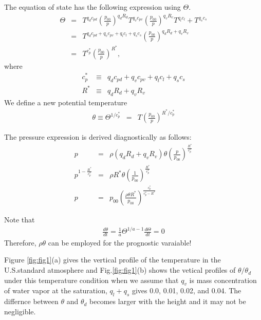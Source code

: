 The equation of state has the following expression using $\Theta$.
\begin{eqnarray}
\Theta &=& 
T^{q_d c_{pd}} \left(\frac{p_{00}}{p}\right)^{q_d R_d} 
T^{q_v c_{pv}} \left(\frac{p_{00}}{p}\right)^{q_v R_v}
T^{q_l c_l}  + T^{q_s c_s} \\
&=& 
T^{q_d c_{pd} +q_vc_{pv}+q_lc_l+q_sc_s}
\left(\frac{p_{00}}{p}\right)^{q_d R_d + q_v R_v} \\
&=& 
T^{c_p^*}\left(\frac{p_{00}}{p}\right)^{R^*},
\end{eqnarray}
where 
\begin{eqnarray}
  c_p^* &\equiv& q_d c_{pd} +q_vc_{pv}+q_lc_l+q_sc_s\\
  R^* &\equiv& q_d R_d + q_v R_v
\end{eqnarray}
We define a new potential temperature 
\begin{eqnarray}
\theta \equiv \Theta^{1/c_p^*} &=& T \left(\frac{p_{00}}{p}\right)^{R^*/c_p^*}
\end{eqnarray}

The pressure expression is derived diagnostically as follows:
\begin{eqnarray}
p&=&\rho (q_d R_d + q_v R_v) \theta \left(\frac{p}{p_{00}}\right)^{\frac{R^*}{c_{p}^*}}\\
p^{1-\frac{R^*}{c_{p}^*}}&=&\rho R^* \theta \left(\frac{1}{p_{00}}\right)^{\frac{R^*}{c_{p}^*}}\\
p&=&p_{00}\left(\frac{\rho \theta R^*}{p_{00}} \right)^{\frac{c_{p}^*}{c_{p}^*- R^*}}
\end{eqnarray}

Note that
\begin{eqnarray}
  \frac{d \theta}{dt} = \frac{1}{a} \Theta^{1/a-1} \frac{d \Theta}{dt} = 0 
  \label{eq:theta_theta_relation}
\end{eqnarray}
Therefore, $\rho \theta$ can be employed for the prognostic varaiable!

Figure \ref{fig:fig1}(a) gives the vertical profile of the temperature 
in the U.S.standard atmosphere and Fig.\ref{fig:fig1}(b) shows
the vetical profiles of $\theta/\theta_d$ under this temperature condition
when we assume that $q_v$ is mass concentration of water vapor at the saturation,
$q_l+q_s$ gives 0.0, 0.01, 0.02, and 0.04.
The differnce between $\theta$ and $\theta_d$ becomes 
larger with the height and it may not be negligible.

